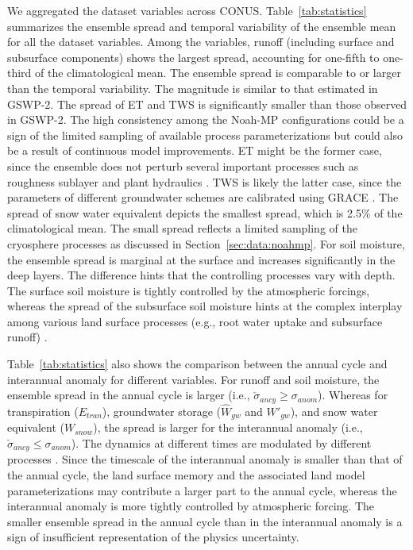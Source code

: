 \documentclass[essd, manuscript]{copernicus}
\begin{document}
We aggregated the dataset variables across CONUS\@. Table~\ref{tab:statistics} summarizes the ensemble spread and temporal variability of the ensemble mean for all the dataset variables. Among the variables, runoff (including surface and subsurface components) shows the largest spread, accounting for one-fifth to one-third of the climatological mean. The ensemble spread is comparable to or larger than the temporal variability. The magnitude is similar to that estimated in GSWP-2. The spread of ET and TWS is significantly smaller than those observed in GSWP-2. The high consistency among the Noah-MP configurations could be a sign of the limited sampling of available process parameterizations but could also be a result of continuous model improvements. ET might be the former case, since the ensemble does not perturb several important processes such as roughness sublayer \citep{abolafia-rosenzweig2021JAMES} and plant hydraulics \citep{li2021JAMESa}. TWS is likely the latter case, since the parameters of different groundwater schemes are calibrated using GRACE \citep{niu2007JGRa}. The spread of snow water equivalent depicts the smallest spread, which is 2.5\% of the climatological mean. The small spread reflects a limited sampling of the cryosphere processes as discussed in Section~\ref{sec:data:noahmp}. For soil moisture, the ensemble spread is marginal at the surface and increases significantly in the deep layers. The difference hints that the controlling processes vary with depth. The surface soil moisture is tightly controlled by the atmospheric forcings, whereas the spread of the subsurface soil moisture hints at the complex interplay among various land surface processes (e.g., root water uptake and subsurface runoff) \citep{koster2015BAMS}.

Table~\ref{tab:statistics} also shows the comparison between the annual cycle and interannual anomaly for different variables. For runoff and soil moisture, the ensemble spread in the annual cycle is larger (i.e., \(\check{\sigma}_{ancy} \ge \sigma_{anom}\)). Whereas for transpiration (\(E_{tran}\)), groundwater storage (\(\hat{W}_{gw}\) and \(W'_{gw}\)), and snow water equivalent (\(W_{snow}\)), the spread is larger for the interannual anomaly (i.e., \(\check{\sigma}_{ancy} \le \sigma_{anom}\)). The dynamics at different times are modulated by different processes \citep{dickinson2003AAS}. Since the timescale of the interannual anomaly is smaller than that of the annual cycle, the land surface memory and the associated land model parameterizations may contribute a larger part to the annual cycle, whereas the interannual anomaly is more tightly controlled by atmospheric forcing. The smaller ensemble spread in the annual cycle than in the interannual anomaly is a sign of insufficient representation of the physics uncertainty.
\end{document}
